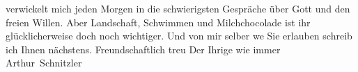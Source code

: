                verwickelt mich jeden Morgen in die schwierigsten Gespräche über Gott und \introOben{}den\introOben{} freien Willen. Aber Landschaft, Schwimmen und
               Milchchocolade ist ihr glücklicherweise doch noch wichtiger.\pend
           \pstart
           Und von mir selber we{\geminationn} Sie erlauben schreib ich Ihnen
               nächstens. Freundschaftlich treu\pend
           \pstart Der Ihrige wie immer \spacefill\mbox{Arthur Schnitzler}\pend{}\endnumbering{}  
      